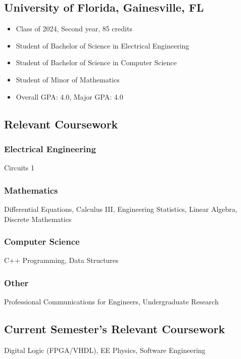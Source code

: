 \documentclass{article}
\newcommand\halftextbox[1]{%
  \parbox[t]{.475\textwidth}{#1}%
}
\newcommand\spacetextbox[1]{%
  \parbox{.05\textwidth}{#1}%
}
\newenvironment{CustomItemize}
{ \begin{itemize}[leftmargin=1em]
    \setlength{\itemsep}{0pt}
    \setlength{\parskip}{0pt}
    \setlength{\parindent}{0pt}
    \setlength{\parsep}{0pt}     }
{ \end{itemize}                  }
\begin{document}
\noindent
\halftextbox{
\begin{raggedright}
\subsection{University of Florida,  Gainesville, FL}
\begin{CustomItemize}
\item Class of 2024, Second year, 85 credits
\item Student of Bachelor of Science in Electrical Engineering
\item Student of Bachelor of Science in Computer Science
\item Student of Minor of Mathematics
\item Overall GPA: 4.0, Major GPA: 4.0
\end{CustomItemize}

\vspace{.94em}
\subsection{Relevant Coursework}
\subsubsection{Electrical Engineering}
Circuits 1
\end{raggedright}
}
\spacetextbox{\hfil\hfil}
\halftextbox{
\begin{raggedright}
\subsubsection{Mathematics}
Differential Equations, 
Calculus III,
Engineering Statistics, 
Linear Algebra,
Discrete Mathematics

\subsubsection{Computer Science}
C++ Programming,
Data Structures

\subsubsection{Other}
Professional Communications for Engineers,
Undergraduate Research

\subsection{Current Semester's Relevant Coursework}
Digital Logic (FPGA/VHDL), EE Physics, Software Engineering
\end{raggedright}
}
\end{document}
